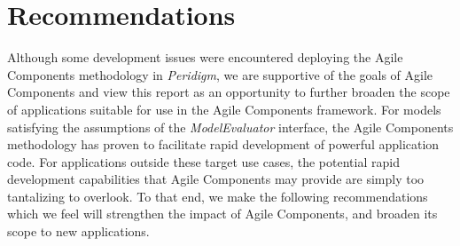 \documentclass[pdf,ps2pdf,12pt,report]{SANDreport}
\theoremstyle{plain}
\theoremstyle{definition}
\theoremstyle{remark}
\numberwithin{equation}{section}
\begin{document}
\section{Recommendations} \label{sec:recommendations}
Although some development issues were encountered deploying the Agile Components methodology in \emph{Peridigm}, we are supportive of the goals of Agile Components and view this report as an opportunity to further broaden the scope of applications suitable for use in the Agile Components framework. For models satisfying the assumptions of the \emph{ModelEvaluator} interface, the Agile Components methodology has proven to facilitate rapid development of powerful application code. For applications outside these target use cases, the potential rapid development capabilities that Agile Components may provide are simply too tantalizing to overlook. To that end, we make the following recommendations which we feel will strengthen the impact of Agile Components, and broaden its scope to new applications.
\end{document}
